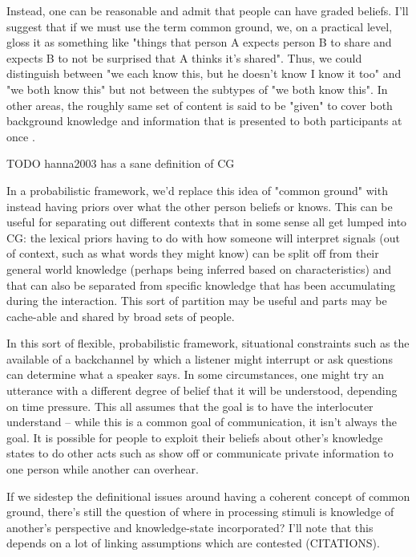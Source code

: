 \documentclass[]{article}
\begin{document}
 Instead, one can be reasonable and admit that people can have graded beliefs. I'll suggest that if we must use the term common ground, we, on a practical level, gloss it as something like "things that person A expects person B to share and expects B to not be surprised that A thinks it's shared". Thus, we could distinguish between "we each know this, but he doesn't know I know it too" and "we both know this" but not between the subtypes of "we both know this". In other areas, the roughly same set of content is said to be "given" to cover both background knowledge and information that is presented to both participants at once \cite{fay2010}. 
 
 TODO hanna2003 has a sane definition of CG
 
 

In a probabilistic framework, we'd replace this idea of "common ground" with instead having priors over what the other person beliefs or knows. This can be useful for separating out different contexts that in some sense all get lumped into CG: the lexical priors having to do with how someone will interpret signals (out of context, such as what words they might know) can be split off from their general world knowledge (perhaps being inferred based on characteristics) and that can also be separated from specific knowledge that has been accumulating during the interaction. This sort of partition may be useful and parts may be cache-able and shared by broad sets of people. 

In this sort of flexible, probabilistic framework, situational constraints such as the available of a backchannel by which a listener might interrupt or ask questions can determine what a speaker says. In some circumstances, one might try an utterance with a different degree of belief that it will be understood, depending on time pressure. This all assumes that the goal is to have the interlocuter understand -- while this is a common goal of communication, it isn't always the goal. It is possible for people to exploit their beliefs about other's knowledge states to do other acts such as show off or communicate private information to one person while another can overhear.  


If we sidestep the definitional issues around having a coherent concept of common ground, there's still the question of where in processing stimuli is knowledge of another's perspective and knowledge-state incorporated? I'll note that this depends on a lot of linking assumptions which are contested (CITATIONS). 
\end{document}
